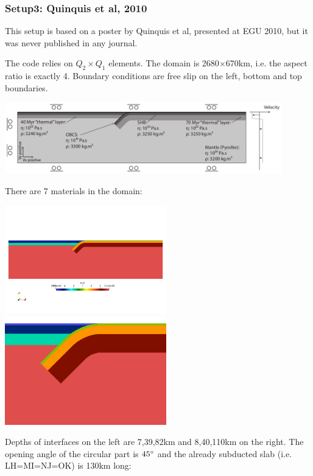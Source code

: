 \subsubsection{Setup3: Quinquis et al, 2010}

This setup is based on a poster by Quinquis et al, presented at EGU 2010, but it
was never published in any journal.

The code relies on $Q_2\times Q_1$ elements. 
The domain is 2680$\times$670km, i.e. the aspect ratio is exactly 4.
Boundary conditions are free slip on the left, bottom and top boundaries. 


\begin{center}
\includegraphics[width=12cm]{python_codes/fieldstone_67/images/setup}
\end{center}

There are 7 materials in the domain:
\begin{center}
\includegraphics[width=7cm]{python_codes/fieldstone_67/images/mats}
\includegraphics[width=7cm]{python_codes/fieldstone_67/images/maats}
\end{center}

Depths of interfaces on the left are 7,39,82km and 8,40,110km on the right.
The opening angle of the circular part is $45\degree$ and the 
already subducted slab (i.e. LH=MI=NJ=OK) is 130km long:

